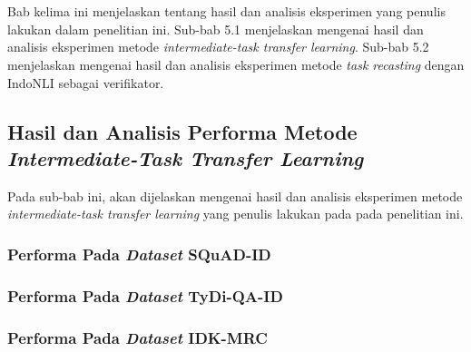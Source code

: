 \chapter{\babLima}
\label{bab:5}
Bab kelima ini menjelaskan tentang hasil dan analisis eksperimen yang penulis lakukan dalam penelitian ini. Sub-bab 5.1 menjelaskan mengenai hasil dan analisis eksperimen metode \emph{intermediate-task transfer learning}. Sub-bab 5.2 menjelaskan mengenai hasil dan analisis eksperimen metode \emph{task recasting} dengan IndoNLI sebagai verifikator.

\section{Hasil dan Analisis Performa Metode \emph{Intermediate-Task Transfer Learning}}
Pada sub-bab ini, akan dijelaskan mengenai hasil dan analisis eksperimen metode \emph{intermediate-task transfer learning} yang penulis lakukan pada pada penelitian ini. 

\subsection{Performa Pada \emph{Dataset} SQuAD-ID}

\subsection{Performa Pada \emph{Dataset} TyDi-QA-ID}

\subsection{Performa Pada \emph{Dataset} IDK-MRC}


